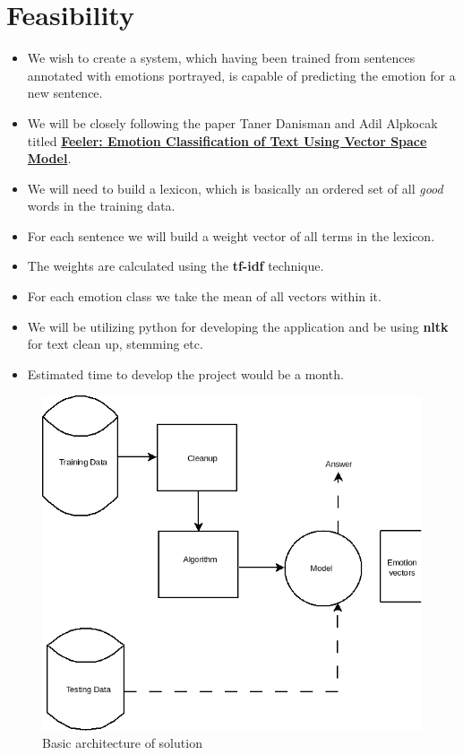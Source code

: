 \section{Feasibility}
\label{sec-feasibility}
\begin{itemize}
\item We wish to create a system, which having been trained from sentences annotated with emotions portrayed, is capable of predicting the emotion for a new sentence.
\item We will be closely following the paper Taner Danisman and Adil Alpkocak titled \href{http://people.cs.deu.edu.tr/alpkocak/Papers/AISB08.pdf}{\textbf{Feeler: Emotion Classification of Text Using Vector Space Model}}.
\item We will need to build a lexicon, which is basically an ordered set of all \emph{good} words in the training data.
\item For each sentence we will build a weight vector of all terms in the lexicon.
\item The weights are calculated using the \textbf{tf-idf} technique.
\item For each emotion class we take the mean of all vectors within it.
\item We will be utilizing python for developing the application and be using \textbf{nltk} for text clean up, stemming etc.
\item Estimated time to develop the project would be a month.
\end{itemize}
\begin{center}
	\begin{figure}[ht!]
	\caption{Basic architecture of solution}
	\includegraphics[scale=0.5]{ml.png}
	\end{figure}
\end{center}
